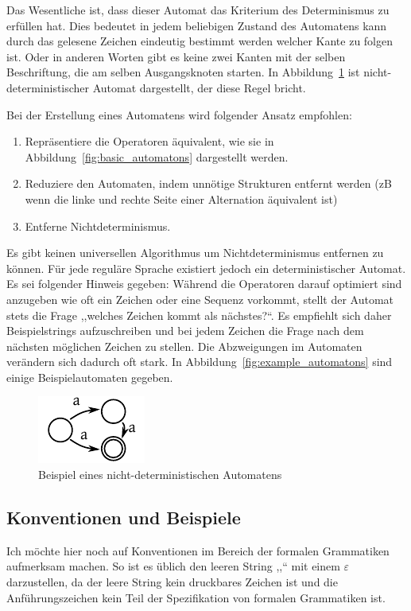 Das Wesentliche ist, dass dieser Automat das Kriterium des Determinismus zu erfüllen hat. Dies bedeutet in jedem beliebigen Zustand des Automatens kann durch das gelesene Zeichen eindeutig bestimmt werden welcher Kante zu folgen ist. Oder in anderen Worten gibt es keine zwei Kanten mit der selben Beschriftung, die am selben Ausgangsknoten starten. In Abbildung~\ref{fig:nondeterministic_automaton} ist nicht-deterministischer Automat dargestellt, der diese Regel bricht.

Bei der Erstellung eines Automatens wird folgender Ansatz empfohlen:
\begin{enumerate}
  \item Repräsentiere die Operatoren äquivalent, wie sie in Abbildung~\ref{fig:basic_automatons} dargestellt werden.
  \item Reduziere den Automaten, indem unnötige Strukturen entfernt werden (zB wenn die linke und rechte Seite einer Alternation äquivalent ist)
  \item Entferne Nichtdeterminismus.
\end{enumerate}
%
Es gibt keinen universellen Algorithmus um Nichtdeterminismus entfernen zu können. Für jede reguläre Sprache existiert jedoch ein deterministischer Automat. Es sei folgender Hinweis gegeben: Während die Operatoren darauf optimiert sind anzugeben wie oft ein Zeichen oder eine Sequenz vorkommt, stellt der Automat stets die Frage ,,welches Zeichen kommt als nächstes?``. Es empfiehlt sich daher Beispielstrings aufzuschreiben und bei jedem Zeichen die Frage nach dem nächsten möglichen Zeichen zu stellen. Die Abzweigungen im Automaten verändern sich dadurch oft stark. In Abbildung~\ref{fig:example_automatons} sind einige Beispielautomaten gegeben.
%
\begin{figure}[hb]
 \begin{center}
  \includegraphics{img/nondeterministic_automaton.pdf}
  \caption{Beispiel eines nicht-deterministischen Automatens}
  \label{fig:nondeterministic_automaton}
 \end{center}
\end{figure}

\subsection{Konventionen und Beispiele}
%
Ich möchte hier noch auf Konventionen im Bereich der formalen Grammatiken aufmerksam machen. So ist es üblich den leeren String ,,`` mit einem $\varepsilon$ darzustellen, da der leere String kein druckbares Zeichen ist und die Anführungszeichen kein Teil der Spezifikation von formalen Grammatiken ist.

